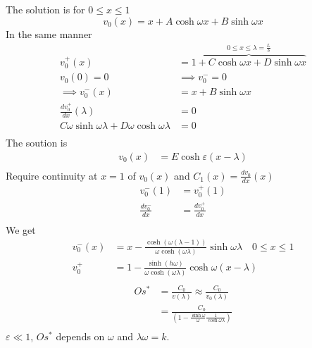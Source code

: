 \documentclass{article}
\theoremstyle{remark}
\begin{document}
The solution is for $0 \le x \le 1$\[
v_{0} \left( x \right) = x + A \cosh \omega x + B \sinh \omega  x
\] 
In the same manner \[
  \begin{split}
v_{0} ^{+} \left( x \right) &= \overbrace{1 + C \cosh \omega x + D\sinh \omega x }^{0\le x \le \lambda = \frac{L}{\delta}  } \\
v_{0}\left( 0 \right) = 0  &  \implies  v_{0} ^{ -} = 0 \\
\implies  v_{0} ^{ -} \left( x \right) &=  x + B\sinh \omega x \\
\frac{d v_{0}^{+}}{d x}  \left( \lambda  \right) &=  0 \\
C \omega  \sinh \omega \lambda  +  D\omega \cosh \omega \lambda  &=  0 \\
  \end{split} 
\] 
The soution is \[
  \begin{split}
v_{0}\left( x \right) &=  E  \cosh \varepsilon \left( x- \lambda  \right) \\
  \end{split} 
\] 
Require continuity at $x = 1$  of  $ v_{0}\left( x \right)$ and $C_{1}\left( x \right) = \frac{d v_{0}}{d x}  \left( x \right)$\[
  \begin{split}
    v_{0}^{-} \left( 1 \right) &=  v_{0}^{+}\left( 1 \right) \\
    \frac{d v_{0}^{-}}{d x}  &=  \frac{d v_{0}^{+}}{d x}  \\
  \end{split} 
\] 
We get \[
  \begin{split}
v_{0}^{-} \left( x \right) &=  x - \frac{\cosh \left( \omega \left( \lambda  -1 \right) \right)}{ \omega  \cosh \left( \omega \lambda  \right)}  \sinh \omega \lambda  \quad  0\le x \le 1  \\
v_{0} ^{+} &=  1- \frac{\sinh \left( h \omega  \right)}{ \omega  \cosh \left( \omega \lambda  \right)} \cosh\omega \left( x-\lambda  \right) \\
  \end{split} 
\] 
\[
  \begin{split}
  Os ^{* }  &  = \frac{C_{0}}{v\left( \lambda  \right)}  \approx \frac{C_{0}}{v_{0}\left( \lambda  \right)}  \\
  &=  \frac{C_{0}}{ \left( 1 - \frac{\sinh \omega  }{\omega }  \frac{1}{\cosh \omega  \lambda }  \right)}  \\
  \end{split} 
\] 
$\varepsilon  \ll  1$, $Os ^{*}$ depends on $ \omega  $ and $ \lambda  \omega  = k$. 
\end{document}
